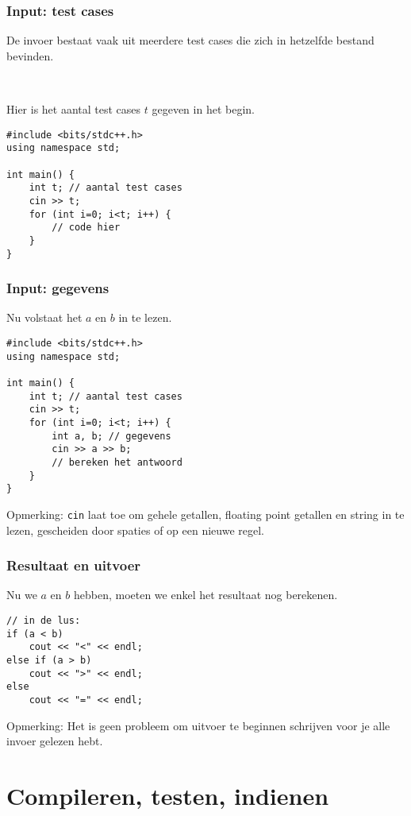 \documentclass[12pt]{beamer}
\begin{document}
\begin{frame}[fragile]
\frametitle{Input: test cases}
De invoer bestaat vaak uit meerdere test cases die zich in hetzelfde bestand bevinden.

~

Hier is het aantal test cases $t$ gegeven in het begin.
\begin{lstlisting}
#include <bits/stdc++.h>
using namespace std;

int main() {
    int t; // aantal test cases
    cin >> t;
    for (int i=0; i<t; i++) {
        // code hier
    }
}
\end{lstlisting}
\end{frame}

\begin{frame}[fragile]
\frametitle{Input: gegevens}
Nu volstaat het $a$ en $b$ in te lezen.
\begin{lstlisting}
#include <bits/stdc++.h>
using namespace std;

int main() {
    int t; // aantal test cases
    cin >> t;
    for (int i=0; i<t; i++) {
        int a, b; // gegevens
        cin >> a >> b;
        // bereken het antwoord
    }
}
\end{lstlisting}
    Opmerking: \lstinline|cin| laat toe om gehele getallen, floating point getallen en string in te lezen, gescheiden door spaties of op een nieuwe regel.
\end{frame}

\begin{frame}[fragile]
\frametitle{Resultaat en uitvoer}
Nu we $a$ en $b$ hebben, moeten we enkel het resultaat nog berekenen.
\begin{lstlisting}
// in de lus:
if (a < b)
    cout << "<" << endl;
else if (a > b)
    cout << ">" << endl;
else
    cout << "=" << endl;
\end{lstlisting}
    Opmerking: Het is geen probleem om uitvoer te beginnen schrijven voor je alle invoer gelezen hebt.
\end{frame}


\section{Compileren, testen, indienen}
\end{document}
